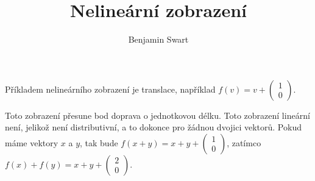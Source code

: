 \documentclass{article}
\title{Nelineární zobrazení}
\author{Benjamin Swart}
\begin{document}
Příkladem nelineárního zobrazení je translace, například $f\left(v\right) = v + \begin{pmatrix}
        1 \\
        0
    \end{pmatrix}$.

Toto zobrazení přesune bod doprava o jednotkovou délku. Toto zobrazení lineární není, jelikož není distributivní, a to dokonce pro žádnou dvojici vektorů. Pokud máme vektory $x$ a $y$, tak bude $f\left(x + y\right) = x + y + \begin{pmatrix} 1 \\ 0 \end{pmatrix}$, zatímco $f\left(x\right) + f\left(y\right) = x + y + \begin{pmatrix} 2 \\ 0 \end{pmatrix}$.
\end{document}
